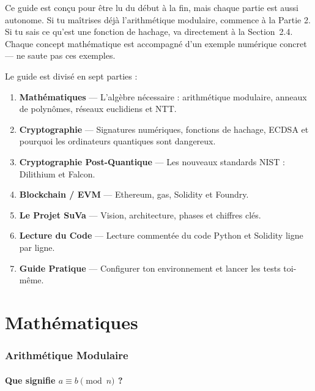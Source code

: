 \documentclass[11pt,a4paper]{article}
\begin{document}
\begin{infobox}
Ce guide est conçu pour être lu du début à la fin, mais chaque partie est aussi autonome.
Si tu maîtrises déjà l'arithmétique modulaire, commence à la Partie 2.
Si tu sais ce qu'est une fonction de hachage, va directement à la Section~2.4.
Chaque concept mathématique est accompagné d'un exemple numérique concret --- ne saute pas ces exemples.
\end{infobox}

Le guide est divisé en sept parties :

\begin{enumerate}
  \item \textbf{Mathématiques} --- L'algèbre nécessaire : arithmétique modulaire, anneaux de polynômes, réseaux euclidiens et NTT.
  \item \textbf{Cryptographie} --- Signatures numériques, fonctions de hachage, ECDSA et pourquoi les ordinateurs quantiques sont dangereux.
  \item \textbf{Cryptographie Post-Quantique} --- Les nouveaux standards NIST : Dilithium et Falcon.
  \item \textbf{Blockchain / EVM} --- Ethereum, gas, Solidity et Foundry.
  \item \textbf{Le Projet SuVa} --- Vision, architecture, phases et chiffres clés.
  \item \textbf{Lecture du Code} --- Lecture commentée du code Python et Solidity ligne par ligne.
  \item \textbf{Guide Pratique} --- Configurer ton environnement et lancer les tests toi-même.
\end{enumerate}

\newpage

\part{Mathématiques}

\section{Arithmétique Modulaire}

\subsection{Que signifie $a \equiv b \pmod{n}$ ?}
\end{document}
